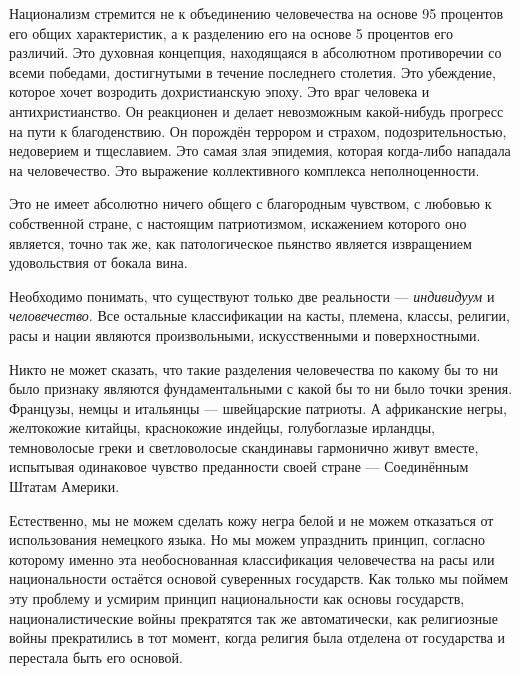 Национализм стремится не к объединению человечества на основе 95 процентов его общих характеристик, а к разделению его на основе 5 процентов его различий. Это духовная концепция, находящаяся в абсолютном противоречии со всеми победами, достигнутыми в течение последнего столетия. Это убеждение, которое хочет возродить дохристианскую эпоху. Это враг человека и антихристианство. Он реакционен и делает невозможным какой-нибудь прогресс на пути к благоденствию. Он порождён террором и страхом, подозрительностью, недоверием и тщеславием. Это самая злая эпидемия, которая когда-либо нападала на человечество. Это выражение коллективного комплекса неполноценности.

Это не имеет абсолютно ничего общего с благородным чувством, с любовью к собственной стране, с настоящим патриотизмом, искажением которого оно является, точно так же, как патологическое пьянство является извращением удовольствия от бокала вина.

Необходимо понимать, что существуют только две реальности — \textit{индивидуум} и \textit{человечество}. Все остальные классификации на касты, племена, классы, религии, расы и нации являются произвольными, искусственными и поверхностными.

Никто не может сказать, что такие разделения человечества по какому бы то ни было признаку являются фундаментальными с какой бы то ни было точки зрения. Французы, немцы и итальянцы — швейцарские патриоты. А африканские негры, желтокожие китайцы, краснокожие индейцы, голубоглазые ирландцы, темноволосые греки и светловолосые скандинавы гармонично живут вместе, испытывая одинаковое чувство преданности своей стране — Соединённым Штатам Америки.

Естественно, мы не можем сделать кожу негра белой и не можем отказаться от использования немецкого языка. Но мы можем упразднить принцип, согласно которому именно эта необоснованная классификация человечества на расы или национальности остаётся основой суверенных государств. Как только мы поймем эту проблему и усмирим принцип национальности как основы государств, националистические войны прекратятся так же автоматически, как религиозные войны прекратились в тот момент, когда религия была отделена от государства и перестала быть его основой.
